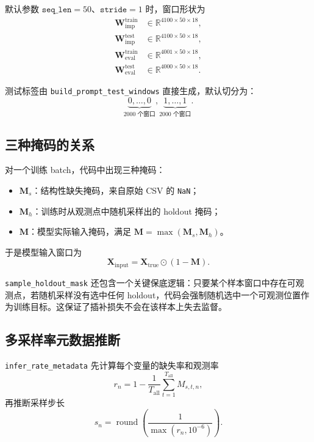 \documentclass[UTF8]{ctexart}
\newcommand{\code}[1]{\texttt{#1}}
\begin{document}
默认参数 \(\texttt{seq\_len}=50\)、\(\texttt{stride}=1\) 时，窗口形状为
\begin{align}
    \bm{W}^{\text{train}}_{\text{imp}} &\in \mathbb{R}^{4100 \times 50 \times 18}, \\
    \bm{W}^{\text{test}}_{\text{imp}} &\in \mathbb{R}^{4100 \times 50 \times 18}, \\
    \bm{W}^{\text{train}}_{\text{eval}} &\in \mathbb{R}^{4001 \times 50 \times 18}, \\
    \bm{W}^{\text{test}}_{\text{eval}} &\in \mathbb{R}^{4000 \times 50 \times 18}.
\end{align}

测试标签由 \code{build\_prompt\_test\_windows} 直接生成，默认切分为：
\begin{equation}
    \underbrace{0,\dots,0}_{2000\text{ 个窗口}},
    \underbrace{1,\dots,1}_{2000\text{ 个窗口}}.
\end{equation}

\subsection{三种掩码的关系}

对一个训练 batch，代码中出现三种掩码：
\begin{itemize}
    \item \(\bm{M}_s\)：结构性缺失掩码，来自原始 CSV 的 \code{NaN}；
    \item \(\bm{M}_h\)：训练时从观测点中随机采样出的 holdout 掩码；
    \item \(\bm{M}\)：模型实际输入掩码，满足 \(\bm{M}=\max(\bm{M}_s,\bm{M}_h)\)。
\end{itemize}

于是模型输入窗口为
\begin{equation}
    \bm{X}_{\text{input}} = \bm{X}_{\text{true}} \odot (1-\bm{M}).
\end{equation}

\code{sample\_holdout\_mask} 还包含一个关键保底逻辑：只要某个样本窗口中存在可观测点，若随机采样没有选中任何 holdout，代码会强制随机选中一个可观测位置作为训练目标。这保证了插补损失不会在该样本上失去监督。

\subsection{多采样率元数据推断}

\code{infer\_rate\_metadata} 先计算每个变量的缺失率和观测率
\begin{equation}
    r_n = 1 - \frac{1}{T_{\text{all}}}\sum_{t=1}^{T_{\text{all}}} M_{s,t,n},
\end{equation}
再推断采样步长
\begin{equation}
    s_n = \operatorname{round}\!\left(\frac{1}{\max(r_n,10^{-6})}\right).
\end{equation}
\end{document}
